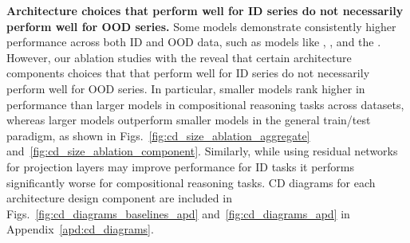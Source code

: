 \textbf{Architecture choices that perform well for ID series do not necessarily perform well for OOD series.} Some models demonstrate consistently higher performance across both ID and OOD data, such as models like \NHITS, \NBEATS, \MLP and the \Tfive. However, our ablation studies with the \Tfive reveal that certain architecture components choices that that perform well for ID series do not necessarily perform well for OOD series. In particular, smaller models rank higher in performance than larger models in compositional reasoning tasks across datasets, whereas larger models outperform smaller models in the general train/test paradigm, as shown in Figs.~\ref{fig:cd_size_ablation_aggregate} and~\ref{fig:cd_size_ablation_component}. Similarly, while using residual networks for projection layers may improve performance for ID tasks it performs significantly worse for compositional reasoning tasks. CD diagrams for each architecture design component are included in Figs.~\ref{fig:cd_diagrams_baselines_apd} and~\ref{fig:cd_diagrams_apd} in Appendix~\ref{apd:cd_diagrams}. 

